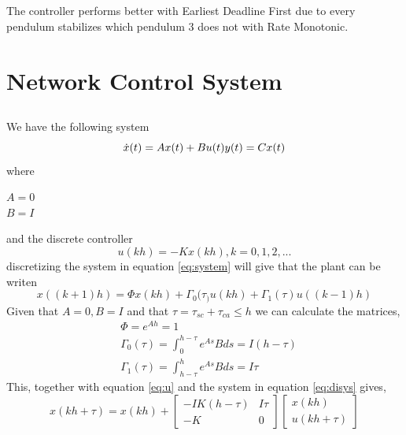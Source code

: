 \documentclass[12pt,a4paper]{article}
\begin{document}
\subsection{}
The controller performs better with Earliest Deadline First due to every pendulum stabilizes which pendulum 3 does not with Rate Monotonic. 





\section{Network Control System}
\subsection{} %
We have the following system
  \begin{equation}
    \dot{x}(t) = Ax(t)+Bu(t) \\
    y(t) = Cx(t)
    \label{eq:system}
  \end{equation}
where
\begin{center}
$A=0$ \\
$B=I$
\end{center}
and the discrete controller
\begin{equation}
    u(kh) = -Kx(kh),    k = 0,1,2,...
    \label{eq:u}
\end{equation}
discretizing the system in equation \ref{eq:system} will give that the
plant can be writen
\begin{equation}
    x((k+1)h)=\Phi x(kh)+\Gamma_{0}(\tau_)u(kh)+\Gamma_{1}(\tau)u((k-1)h)
    \label{eq:disys}
\end{equation}
Given that $A=0, B=I$ and that $\tau = \tau_{sc}+\tau_{ca}\le h$ we can
calculate the matrices,
\begin{align*}
    &\Phi=e^{Ah}=1 \\
    &\Gamma_{0}(\tau)=\int_{0}^{h-\tau}e^{As}Bds=I(h-\tau) \\
    &\Gamma_{1}(\tau)=\int_{h-\tau}^{h}e^{As}Bds=I\tau
\end{align*}
This, together with equation \ref{eq:u} and the system in equation \ref{eq:disys}
gives,
\begin{equation}
  x(kh+\tau)=x(kh)+
  \begin{bmatrix}
    -IK(h-\tau) & I\tau\\
    -K & 0
  \end{bmatrix}
  \begin{bmatrix}
    x(kh) \\
    u(kh+\tau)
  \end{bmatrix}
\end{equation}
\end{document}
